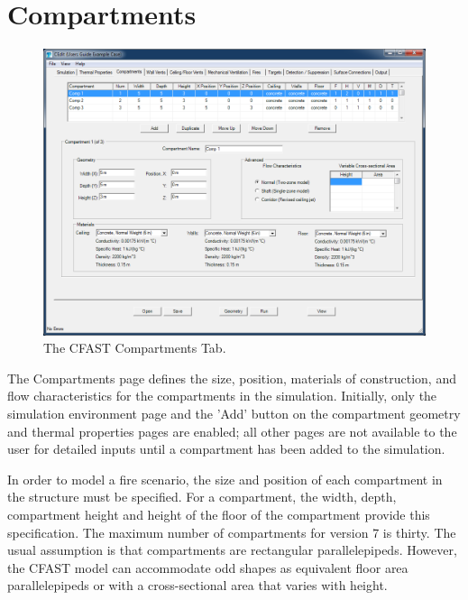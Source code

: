 \chapter{Compartments}

\begin{figure}[h!]
\begin{center}
\includegraphics[width=6.5in]{FIGURES/Compartment_Geometry_Tab}
\caption[The CFAST Compartments Tab]{The CFAST Compartments Tab.}
\end{center}
\end{figure}

The Compartments page defines the size, position, materials of construction, and flow characteristics for the compartments in the simulation. Initially, only the simulation environment page and the 'Add' button on the compartment geometry and thermal properties pages are enabled; all other pages are not available to the user for detailed inputs until a compartment has been added to the simulation.

In order to model a fire scenario, the size and position of each compartment in the structure must be specified. For a compartment, the width, depth, compartment height and height of the floor of the compartment provide this specification. The maximum number of compartments for version 7 is thirty. The usual assumption is that compartments are rectangular parallelepipeds. However, the CFAST model can accommodate odd shapes as equivalent floor area parallelepipeds or with a cross-sectional area that varies with height.

